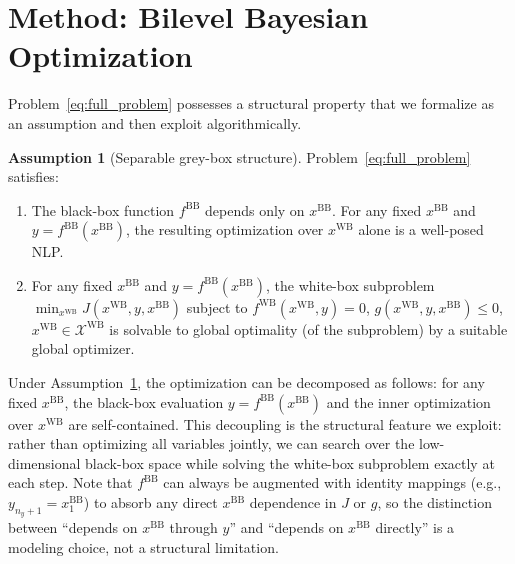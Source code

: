 \documentclass[12pt,a4paper]{article}%
\theoremstyle{plain}%
\theoremstyle{remark}%
\theoremstyle{definition}%
\newtheorem{assumption}{Assumption}%
\def\WB{\mathrm{WB}}
\def\BB{\mathrm{BB}}
\begin{document}
\section{Method: Bilevel Bayesian Optimization}\label{sec:method}

Problem~\eqref{eq:full_problem} possesses a structural property that we formalize as an assumption and then exploit algorithmically.

\begin{assumption}[Separable grey-box structure]\label{ass:separability}
Problem~\eqref{eq:full_problem} satisfies:
\begin{enumerate}
    \item[(i)] The black-box function $f^{\BB}$ depends only on $x^{\BB}$. For any fixed $x^{\BB}$ and $y = f^{\BB}(x^{\BB})$, the resulting optimization over $x^{\WB}$ alone is a well-posed NLP. %
    \item[(ii)] For any fixed $x^{\BB}$ and $y = f^{\BB}(x^{\BB})$, the white-box subproblem $\min_{x^{\WB}} J(x^{\WB}, y, x^{\BB})$ subject to $f^{\WB}(x^{\WB}, y) = 0$, $g(x^{\WB}, y, x^{\BB}) \leq 0$, $x^{\WB} \in \mathcal{X}^{\WB}$ is solvable to global optimality (of the subproblem) by a suitable global optimizer.
\end{enumerate}
\end{assumption}

Under Assumption~\ref{ass:separability}, the optimization can be decomposed as follows: for any fixed $x^{\BB}$, the black-box evaluation $y = f^{\BB}(x^{\BB})$ and the inner optimization over $x^{\WB}$ are self-contained. This decoupling is the structural feature we exploit: rather than optimizing all variables jointly, we can search over the low-dimensional black-box space while solving the white-box subproblem exactly at each step. Note that $f^{\BB}$ can always be augmented with identity mappings (e.g., $y_{n_y+1} = x^{\BB}_1$) to absorb any direct $x^{\BB}$ dependence in $J$ or $g$, so the distinction between ``depends on $x^{\BB}$ through $y$'' and ``depends on $x^{\BB}$ directly'' is a modeling choice, not a structural limitation.
\end{document}
